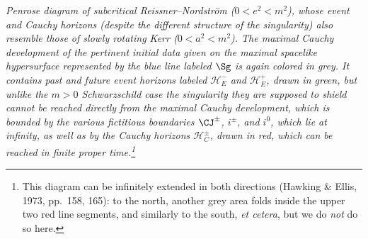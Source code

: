 \documentclass[11pt,a4paper]{article}
\begin{document}
\emph{  Penrose diagram of subcritical Reissner--Nordstr\"{o}m  ($0<e^2<m^2$), whose event and Cauchy horizons (despite the different structure of the singularity) also resemble those of slowly rotating Kerr ($0<a^2<m^2$). The  maximal Cauchy development of the pertinent initial data given on the maximal spacelike hypersurface represented by the blue line labeled $\Sg$ is again colored in grey. It contains past and future event horizons labeled  $\mathcal{H}_E^-$ and $\mathcal{H}_E^+$, drawn in green, but unlike  the $m>0$ Schwarzschild case  the singularity they are supposed to shield cannot be reached directly from the  maximal Cauchy development, which is bounded by the various fictitious boundaries $\CJ^{\pm}$, $i^{\pm}$, and $i^0$, which lie at infinity, as well as by the Cauchy horizons  $\mathcal{H}_C^{\pm}$, drawn in red, which can be reached in finite proper time.\footnote{ 
This diagram can be infinitely extended  in both directions (Hawking \& Ellis, 1973, pp.\ 158, 165): to the north, another grey area folds inside the upper two red line segments, and similarly to the south, \emph{et cetera}, but we do \emph{not} do so here.}}
\end{document}
